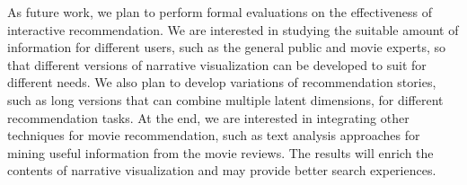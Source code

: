 \documentclass{vgtc}                          %
\begin{document}
As future work, we plan to perform formal evaluations on the effectiveness of interactive recommendation.
We are interested in studying the suitable amount of information for different users, such as the general public and movie experts, so that different versions of narrative visualization can be developed to suit for different needs. 
We also plan to develop variations of recommendation stories, such as long versions that can combine multiple latent dimensions, for different recommendation tasks.
At the end, we are interested in integrating other techniques for movie recommendation, such as text analysis approaches for mining useful information from the movie reviews.
The results will enrich the contents of narrative visualization and may provide better search experiences.








\end{document}
